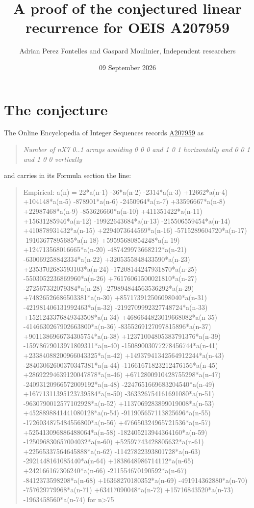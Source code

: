 \documentclass[11pt]{article}
\title{A proof of the conjectured linear recurrence for OEIS A207959}
\author{Adrian Perez Fontelles and Gaspard Moulinier, Independent researchers}
\date{09 September 2026}
\theoremstyle{definition}
\begin{document}
\maketitle
\section{The conjecture}

The Online Encyclopedia of Integer Sequences records \href{https://oeis.org/A207959}{A207959} as

\begin{quote}\itshape Number of nX7 0..1 arrays avoiding 0 0 0 and 1 0 1 horizontally and 0 0 1 and 1 0 0 vertically\end{quote}

and carries in its Formula section the line:

\begin{quote}\ttfamily Empirical: a(n) = 22*a(n-1) -36*a(n-2) -2314*a(n-3) +12662*a(n-4) +104148*a(n-5) -878901*a(n-6) -2450964*a(n-7) +33596667*a(n-8) +22987468*a(n-9) -853626660*a(n-10) +411351422*a(n-11) +15631285946*a(n-12) -19922643684*a(n-13) -215506559454*a(n-14) +410878931432*a(n-15) +2294073644569*a(n-16) -5715289604720*a(n-17) -19103677895685*a(n-18) +59595680854248*a(n-19) +124713568016665*a(n-20) -487429973668212*a(n-21) -630069258842334*a(n-22) +3205355848433590*a(n-23) +2353702683593103*a(n-24) -17208144247931870*a(n-25) -5503052236869960*a(n-26) +76176061500021810*a(n-27) -272567332079384*a(n-28) -279894844563536292*a(n-29) +74826526686503381*a(n-30) +857173912506098040*a(n-31) -421981406131992463*a(n-32) -2192709992327748724*a(n-33) +1521243376849343508*a(n-34) +4686644823019668082*a(n-35) -4146630267902663800*a(n-36) -8355269127097815896*a(n-37) +9011386966734305754*a(n-38) +12371004805383791376*a(n-39) -15978679013971809311*a(n-40) -15089003077278456744*a(n-41) +23384088200966043325*a(n-42) +14937941342564912244*a(n-43) -28403062600370347381*a(n-44) -11661671823212476156*a(n-45) +28692294639120047878*a(n-46) +6712800910428755298*a(n-47) -24093120966572009192*a(n-48) -2247651669683204540*a(n-49) +16771311395123739584*a(n-50) -363326754161691080*a(n-51) -9630790012577102928*a(n-52) +1137069283899019008*a(n-53) +4528898841441080128*a(n-54) -911905657113825696*a(n-55) -1726034875484556800*a(n-56) +476650324965721536*a(n-57) +525413096886488064*a(n-58) -182405213944364160*a(n-59) -125096830657004032*a(n-60) +52597743428805632*a(n-61) +22565337564645888*a(n-62) -11427822393801728*a(n-63) -2921448161085440*a(n-64) +1838648986714112*a(n-65) +242166167306240*a(n-66) -211554670190592*a(n-67) -8412373598208*a(n-68) +16368270180352*a(n-69) -491914362880*a(n-70) -757629779968*a(n-71) +63417090048*a(n-72) +15716843520*a(n-73) -1963458560*a(n-74) for n>75\end{quote}
\end{document}
